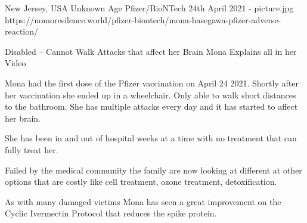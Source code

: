 {New Jersey, USA}
{Unknown Age}
{Pfizer/BioNTech}
{24th April 2021}
{-}
{picture.jpg}
{https://nomoresilence.world/pfizer-biontech/mona-hasegawa-pfizer-adverse-reaction/}
{



Disabled – Cannot Walk
Attacks that affect her Brain
Mona Explains all in her Video

Mona had the first dose of the Pfizer vaccination on April 24 2021. Shortly after her vaccination she ended up in a wheelchair. Only able to walk short distances to the bathroom. She has multiple attacks every day and it has started to affect her brain.

She has been in and out of hospital weeks at a time with no treatment that can fully treat her.

Failed by the medical community the family are now looking at different at other options that are costly like cell treatment, ozone treatment, detoxification.

As with many damaged victims Mona has seen a great improvement on the Cyclic Ivermectin Protocol that reduces the spike protein.
}

